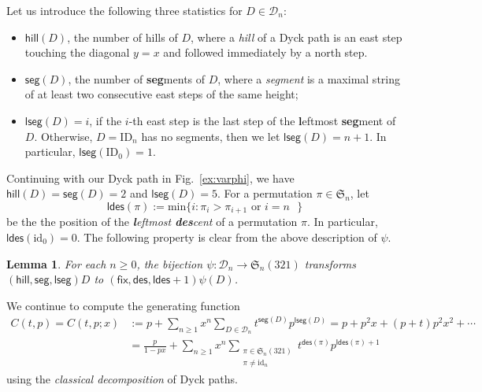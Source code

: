 \documentclass[12pt]{amsart} %
\numberwithin{equation}{section}
\theoremstyle{plain}
\newtheorem{lemma}[theorem]{Lemma}
\theoremstyle{definition}
\def\hill{\mathsf{hill}}
\def\id{\mathrm{id}}
\def\ID{\mathrm{ID}}
\def\fix{\mathsf{fix}}
\def\lseg{\mathsf{lseg}}
\def\seg{\mathsf{seg}}
\def\min{\mathrm{min}}
\def\des{\mathsf{des}}
\def\S{\mathfrak{S}}
\def\ldes{\mathsf{ldes}}
\begin{document}
Let us introduce the following three statistics for $D\in\mathcal{D}_n$:
\begin{itemize}
\item $\hill(D)$, the number of hills of $D$, where a {\em hill} of a Dyck path is an east step touching the diagonal $y=x$ and followed immediately by a north step.
\item $\seg(D)$, the number of {\bf seg}ments of $D$, where a {\em segment} is a maximal string of at least two consecutive east steps of the same height;
\item $\lseg(D)=i$,  if the $i$-th east step is the  last  step of the {\bf l}eftmost {\bf seg}ment  of $D$. Otherwise, $D=\ID_n$ has no segments, then we let $\lseg(D)=n+1$. In particular, $\lseg(\ID_0)=1$. 
\end{itemize}
Continuing with our Dyck path in Fig.~\ref{ex:varphi}, we have  $\hill(D)=\seg(D)=2$ and $\lseg(D)=5$. For a permutation $\pi\in\S_n$, let 
\begin{equation}\label{def:ldes}
\ldes(\pi):=\min\{i:\pi_i>\pi_{i+1} \text{ or $i=n$ }\}
\end{equation}
be the the position of the {\em{\bf\em l}eftmost {\bf\em des}cent} of a permutation $\pi$. In particular, $\ldes(\id_0)=0$. The following property is clear from the above description of $\psi$. 

\begin{lemma}\label{lem:kra}
For each $n\ge 0$, the bijection $\psi:\mathcal{D}_n\rightarrow\S_n(321)$ transforms  $(\hill,\seg,\lseg) D$ to $(\fix,\des,\ldes+1)\psi(D)$. 
\end{lemma}

We continue to compute the generating function  
\begin{align*}
C(t,p)=C(t,p;x)&:=p+\sum_{n\geq1}x^n\sum_{D\in\mathcal{D}_n}t^{\seg(D)}p^{\lseg(D)}=p+p^2x+(p+t)p^2x^2+\cdots\\
&=\frac{p}{1-px}+\sum_{n\geq1}x^n\sum_{\substack{\pi\in\S_n(321) \\ \pi\neq\id_n}}t^{\des(\pi)}p^{\ldes(\pi)+1}
\end{align*}
using the {\em classical decomposition} of Dyck paths. 
\end{document}

